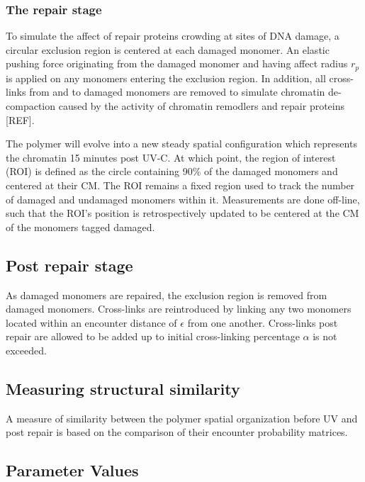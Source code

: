\documentclass[12pt]{article}
\begin{document}
	\subsubsection{The repair stage}	
	To simulate the affect of repair proteins crowding at sites of DNA damage, a circular exclusion region is centered at each damaged monomer. An elastic pushing force originating from the damaged monomer and having affect radius $r_p$ is applied on any monomers entering the exclusion region. In addition, all cross-links from and to damaged monomers are removed to simulate chromatin de-compaction caused by the activity of chromatin remodlers and repair proteins [REF]. 
	
	The polymer will evolve into a new steady spatial configuration which represents the chromatin 15 minutes post UV-C. At which point, the region of interest (ROI) is defined as the circle containing 90\% of the damaged monomers and centered at their CM. The ROI remains a fixed region used to track the number of damaged and undamaged monomers within it. Measurements are done off-line, such that the ROI's position is retrospectively updated to be centered at the CM of the monomers tagged damaged.
	
	\subsection{Post repair stage}
	
	As damaged monomers are repaired, the exclusion region is removed from damaged monomers. Cross-links are reintroduced by linking any two monomers located within an encounter distance of $\epsilon$ from one another. Cross-links post repair are allowed to be added up to initial cross-linking percentage $\alpha$ is not exceeded.
	
	\subsection{Measuring structural similarity}
	A measure of similarity between the polymer spatial organization before UV and post repair is based on the comparison of their encounter probability matrices.
	
	
	\subsection{Parameter Values}
	
	
\end{document}
